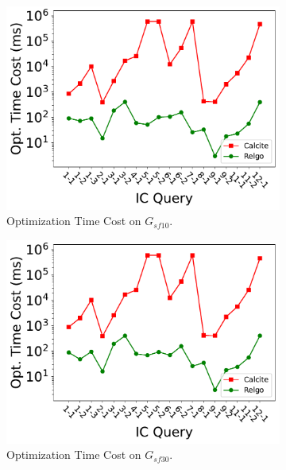 \begin{figure}[ht]
    \centering
    \begin{subfigure}[b]{0.3\linewidth}
        \centering
        \includegraphics[width=\linewidth]{./figures/exp/optimization_sf10.pdf}
        \caption{Optimization Time Cost on $G_{sf10}$.}
        \label{fig:exp-optimization-sf10}
    \end{subfigure}
    \begin{subfigure}[b]{0.3\linewidth}
        \centering
        \includegraphics[width=\linewidth]{./figures/exp/optimization_sf30.pdf}
        \caption{Optimization Time Cost on $G_{sf30}$.}
        \label{fig:exp-optimization-sf30}
    \end{subfigure}
    \begin{subfigure}[b]{0.3\linewidth}

\end{subfigure}
\end{figure}
